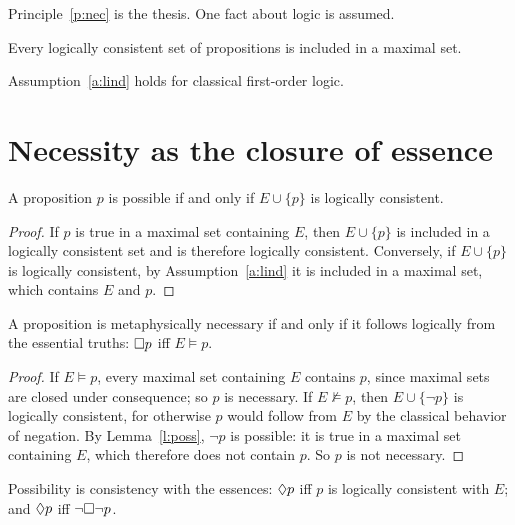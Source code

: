 \documentclass{situationist-preprint}
\begin{document}
Principle~\ref{p:nec} is the thesis. One fact about logic is assumed.

\begin{assumption}\label{a:lind}
Every logically consistent set of propositions is included in a maximal set.
\end{assumption}



Assumption~\ref{a:lind} holds for classical first-order logic.

\section{Necessity as the closure of essence}

\begin{lemma}\label{l:poss}
A proposition $p$ is possible if and only if $E\cup\{p\}$ is logically consistent.
\end{lemma}

\begin{proof}
If $p$ is true in a maximal set containing $E$, then $E\cup\{p\}$ is included in a logically consistent set and is therefore logically consistent. Conversely, if $E\cup\{p\}$ is logically consistent, by Assumption~\ref{a:lind} it is included in a maximal set, which contains $E$ and $p$.
\end{proof}

\begin{theorem}\label{t:closure}
A proposition is metaphysically necessary if and only if it follows logically from the essential truths: $\mathord{\Box} p$ iff $E\vDash p$.
\end{theorem}

\begin{proof}
If $E\vDash p$, every maximal set containing $E$ contains $p$, since maximal sets are closed under consequence; so $p$ is necessary. If $E\nvDash p$, then $E\cup\{\neg p\}$ is logically consistent, for otherwise $p$ would follow from $E$ by the classical behavior of negation. By Lemma~\ref{l:poss}, $\neg p$ is possible: it is true in a maximal set containing $E$, which therefore does not contain $p$. So $p$ is not necessary.
\end{proof}

\begin{corollary}\label{c:dual}
Possibility is consistency with the essences: $\mathord{\Diamond} p$ iff $p$ is logically consistent with $E$; and $\mathord{\Diamond} p$ iff $\neg\mathord{\Box}\neg p$.
\end{corollary}
\end{document}
